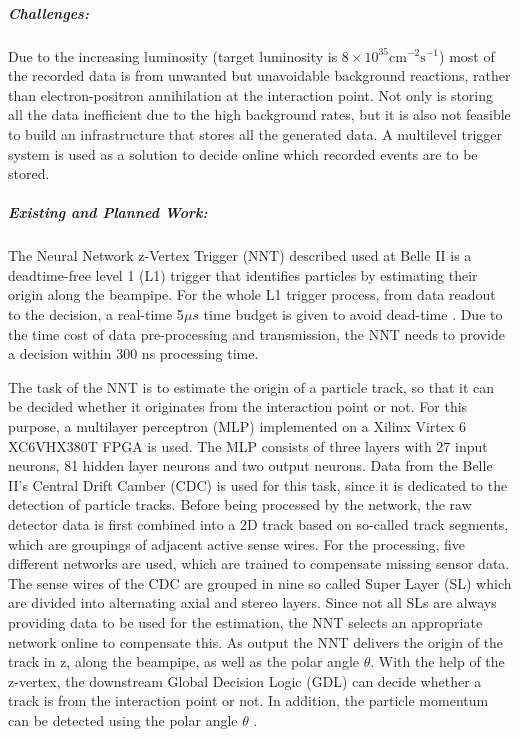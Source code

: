 \subparagraph*{Challenges:} Due to the increasing luminosity (target luminosity is $8\times10^{35}\mathrm{cm}^{-2}\mathrm{s}^{-1}$) most of the recorded data is from unwanted but unavoidable background reactions, rather than electron-positron annihilation at the interaction point.  Not only is storing all the data inefficient due to the high background rates, but it is also not feasible to build an infrastructure that stores all the generated data. A multilevel trigger system is used as a solution to decide online which recorded events are to be stored. 

\subparagraph*{Existing and Planned Work:} The Neural Network z-Vertex Trigger (NNT) described used at Belle II is a deadtime-free level 1 (L1) trigger that identifies particles by estimating their origin along the beampipe. 
For the whole L1 trigger process, from data readout to the decision, a real-time 5$\mu s$ time budget is given to avoid dead-time \cite{Lai_2020}. 
Due to the time cost of data pre-processing and transmission, the NNT needs to provide a decision within 300 ns processing time.

The task of the NNT is to estimate the origin of a particle track, so that it can be decided whether it originates from the interaction point or not. 
For this purpose, a multilayer perceptron (MLP) implemented on a Xilinx Virtex 6 XC6VHX380T FPGA is used. 
The MLP consists of three layers with 27 input neurons, 81 hidden layer neurons and two output neurons. Data from the Belle II's Central Drift Camber (CDC) is used for this task, since it is dedicated to the detection of particle tracks. 
Before being processed by the network, the raw detector data is first combined into a 2D track based on so-called track segments, which are groupings of adjacent active sense wires. For the processing, five different networks are used, which are trained to compensate missing sensor data. 
The sense wires of the CDC are grouped in nine so called Super Layer (SL) which are divided into alternating axial and stereo layers. 
Since not all SLs are always providing data to be used for the estimation, the NNT selects an appropriate network online to compensate this. 
As output the NNT delivers the origin of the track in z, along the beampipe, as well as the polar angle $\theta$. With the help of the z-vertex, the downstream Global Decision Logic (GDL) can decide whether a track is from the interaction point or not. In addition, the particle momentum can be detected using the polar angle $\theta$ \cite{baehr2019low}. 

